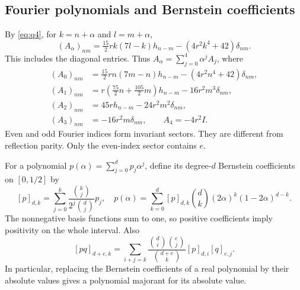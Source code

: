 \documentclass[a4paper,11pt]{article}
\numberwithin{equation}{section}
\theoremstyle{definition}
\theoremstyle{remark}
\begin{document}
\subsection{Fourier polynomials and Bernstein coefficients}
By \eqref{eq:q4}, for $k=n+\alpha$ and $l=m+\alpha$,
\begin{equation}\label{eq:bloch-simple}
 (A_\alpha)_{nm}=\tfrac{15}{2}r k(7l-k)h_{n-m}
 -(4r^2k^4+42)\delta_{nm}.
\end{equation}
This includes the diagonal entries. Thus $A_\alpha=\sum_{j=0}^4\alpha^jA_j$, where
\begin{equation}\label{eq:Aj}
\begin{aligned}
 (A_0)_{nm}&=\tfrac{15}{2}rn(7m-n)h_{n-m}-(4r^2n^4+42)\delta_{nm},\\
 (A_1)_{nm}&=r(\tfrac{75}{2}n+\tfrac{105}{2}m)h_{n-m}-16r^2m^3\delta_{nm},\\
 (A_2)_{nm}&=45rh_{n-m}-24r^2m^2\delta_{nm},\\
 (A_3)_{nm}&=-16r^2m\delta_{nm},\qquad A_4=-4r^2I.
\end{aligned}
\end{equation}
Even and odd Fourier indices form invariant sectors. They are different from reflection parity. Only the even-index sector contains $e$.

For a polynomial $p(\alpha)=\sum_{j=0}^dp_j\alpha^j$, define its degree-$d$ Bernstein coefficients on $[0,1/2]$ by
\begin{equation}\label{eq:Bernstein}
 [p]_{d,k}=\sum_{j=0}^k\frac{\binom{k}{j}}{2^j\binom{d}{j}}p_j,
 \quad
 p(\alpha)=\sum_{k=0}^d[p]_{d,k}\binom dk(2\alpha)^k(1-2\alpha)^{d-k}.
\end{equation}
The nonnegative basis functions sum to one, so positive coefficients imply positivity on the whole interval. Also
\begin{equation}\label{eq:Bernstein-product}
 [pq]_{d+e,k}=\sum_{i+j=k}\frac{\binom di\binom ej}{\binom{d+e}k}
 [p]_{d,i}[q]_{e,j}.
\end{equation}
In particular, replacing the Bernstein coefficients of a real polynomial by their absolute values gives a polynomial majorant for its absolute value.
\end{document}
